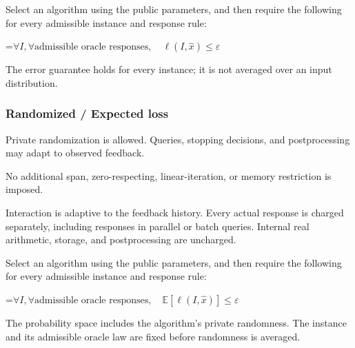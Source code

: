 \documentclass[10pt,a4paper]{article}
\newcommand{\AtlasMath}[1]{\par\begingroup\centering\setbox0=\hbox{$\displaystyle #1$}\ifdim\wd0>1.4\linewidth\typeout{ATLAS WIDE FORMULA: \the\wd0}\fi\ifdim\wd0>\linewidth\resizebox{\linewidth}{!}{\box0}\else\box0\fi\par\endgroup}
\begin{document}
Select an algorithm using the public parameters, and then require the following for every admissible instance and response rule:




\AtlasMath{\forall I,\forall\text{admissible oracle responses},\quad\ell(I,\widehat{x})\le\varepsilon}




The error guarantee holds for every instance; it is not averaged over an input distribution.

\subsubsection{Randomized / Expected loss}
Private randomization is allowed. Queries, stopping decisions, and postprocessing may adapt to observed feedback.

No additional span, zero-respecting, linear-iteration, or memory restriction is imposed.

Interaction is adaptive to the feedback history. Every actual response is charged separately, including responses in parallel or batch queries. Internal real arithmetic, storage, and postprocessing are uncharged.

Select an algorithm using the public parameters, and then require the following for every admissible instance and response rule:




\AtlasMath{\forall I,\forall\text{admissible oracle responses},\quad\mathbb{E}[\ell(I,\widehat{x})]\le\varepsilon}




The probability space includes the algorithm's private randomness. The instance and its admissible oracle law are fixed before randomness is averaged.
\end{document}
